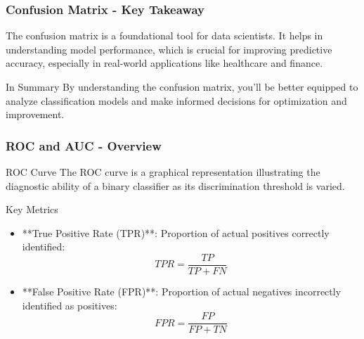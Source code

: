 \documentclass[aspectratio=169]{beamer}
\begin{document}
\begin{frame}[fragile]
    \frametitle{Confusion Matrix - Key Takeaway}
    The confusion matrix is a foundational tool for data scientists. It helps in understanding model performance, which is crucial for improving predictive accuracy, especially in real-world applications like healthcare and finance.
    
    \begin{block}{In Summary}
        By understanding the confusion matrix, you'll be better equipped to analyze classification models and make informed decisions for optimization and improvement.
    \end{block}
\end{frame}

\begin{frame}[fragile]
    \frametitle{ROC and AUC - Overview}
    \begin{block}{ROC Curve}
        The ROC curve is a graphical representation illustrating the diagnostic ability of a binary classifier as its discrimination threshold is varied.
    \end{block}

    \begin{block}{Key Metrics}
        \begin{itemize}
            \item **True Positive Rate (TPR)**: Proportion of actual positives correctly identified:
            \[
            TPR = \frac{TP}{TP + FN}
            \]
            \item **False Positive Rate (FPR)**: Proportion of actual negatives incorrectly identified as positives:
            \[
            FPR = \frac{FP}{FP + TN}
            \]
        \end{itemize}
    \end{block}
\end{frame}
\end{document}
